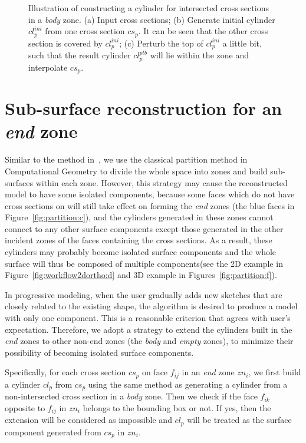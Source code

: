\begin{figure} [htbp]
{\begin{minipage}[b]{0.3\textwidth}
    \end{minipage}}
  \caption{Illustration of constructing a cylinder for intersected cross sections
  in a \textit{body} zone.
  (a) Input cross sections;
  (b) Generate initial cylinder $cl_p^{ini}$ from one cross section $cs_p$. It can be 
  seen that the other cross section is covered by $cl_p^{ini}$;
  (c) Perturb the top of $cl_p^{ini}$ a little bit, such that the result cylinder
  $cl_p^{ptb}$ will lie within the zone and interpolate $cs_p$.}
  \label{fig:csintersPerturb}
\end{figure}


\section{Sub-surface reconstruction for an \textit{end} zone}
\label{ch4:sec:algo:end}

Similar to the method in~\cite{LBDLJ08}, we use  the classical
partition method in Computational Geometry to divide the whole space
into zones and build sub-surfaces within each zone. However, this
strategy may cause the reconstructed model to have some isolated
components, because some faces which do not have cross sections on
will still take effect on forming the \textit{end} zones (the blue
faces in Figure~\ref{fig:partition:c}), and the cylinders generated
in these zones cannot connect to any other surface components except
those generated in the other incident zones of the faces containing
the cross sections. As a result, these cylinders may probably become
isolated surface components and the whole surface will thus be
composed of multiple components(see the 2D example in
Figure~\ref{fig:workflow2dortho:d} and 3D example in
Figures~\ref{fig:partition:f}).

In progressive modeling, when the user  gradually adds new sketches
that are closely related to the existing shape, the algorithm is
desired to produce a model with only one component. This is a
reasonable criterion that agrees with user's expectation. Therefore,
we adopt a strategy to extend the cylinders built in the
\textit{end} zones to other non-end zones (the \textit{body} and
\textit{empty} zones), to minimize their possibility of becoming
isolated surface components.

Specifically, for each cross  section $cs_p$ on face $f_{ij}$ in an
\textit{end} zone $zn_i$, we first build a cylinder $cl_p$ from
$cs_p$ using the same method as generating a cylinder from a
non-intersected cross section in a \textit{body} zone. Then we check
if the face $f_{ik}$ opposite to $f_{ij}$ in $zn_i$ belongs to the
bounding box or not. If yes, then the extension will be considered
as impossible and $cl_p$ will be treated as the surface component
generated from $cs_p$ in $zn_i$.

